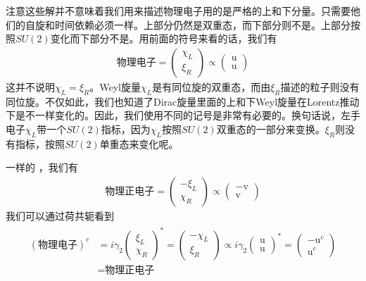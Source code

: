 注意这些解并不意味着我们用来描述物理电子用的是严格的上和下分量。只需要他们的自旋和时间依赖必须一样。上部分仍然是双重态，而下部分则不是。上部分按照$SU(2)$变化而下部分不是。用前面的符号来看的话，我们有
\begin{align}
\text{物理电子}=\left(\begin{matrix}\chi_L\\\xi_R\end{matrix}\right)\propto\left(\begin{matrix}\text{u}\\\text{u}\end{matrix}\right)
\end{align}
这并不说明$\chi_L=\xi_R$。Weyl旋量$\chi_L$是有同位旋的双重态，而由$\xi_R$描述的粒子则没有同位旋。不仅如此，我们也知道了Dirac旋量里面的上和下Weyl旋量在Lorentz推动下是不一样变化的。因此，我们使用不同的记号是非常有必要的。换句话说，左手电子$\chi_L$带一个$SU(2)$指标，因为$\chi_L$按照$SU(2)$双重态的一部分来变换。$\xi_R$则没有指标，按照$SU(2)$单重态来变化呢。

一样的 ，我们有
\begin{align}
\text{物理正电子}=\left(\begin{matrix}-\xi_L\\\chi_R\end{matrix}\right)\propto\left(\begin{matrix}-\text{v}\\\text{v}\end{matrix}\right)
\end{align}
我们可以通过荷共轭看到
\begin{align}
\begin{split}
(\text{物理电子})^c&=i\gamma_2\left(\begin{matrix}\xi_L\\\chi_R\end{matrix}\right)^*=\left(\begin{matrix}-\chi_L\\\xi_R\end{matrix}\right)\propto i\gamma_2\left(\begin{matrix}\text{u}\\\text{u}\end{matrix}\right)^*=\left(\begin{matrix}-\text{u}^c\\\text{u}^c\end{matrix}\right)\\
&=\text{物理正电子}
\end{split}
\end{align}

